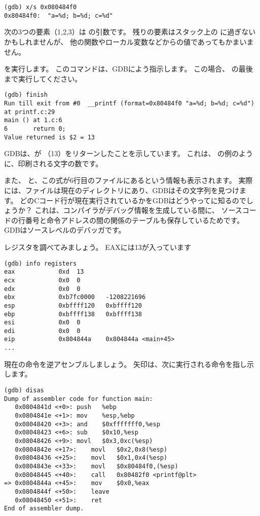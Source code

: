 \begin{lstlisting}
(gdb) x/s 0x080484f0
0x80484f0:	"a=%d; b=%d; c=%d"
\end{lstlisting}

次の3つの要素（1,2,3）は \printf の引数です。
残りの要素はスタック上の に過ぎないかもしれませんが、
他の関数やローカル変数などからの値であってもかまいません。

を実行します。 
このコマンドは、GDBによう指示します。 
この場合、 \printf の最後まで実行してください。

\begin{lstlisting}
(gdb) finish
Run till exit from #0  __printf (format=0x80484f0 "a=%d; b=%d; c=%d") at printf.c:29
main () at 1.c:6
6		return 0;
Value returned is $2 = 13
\end{lstlisting}

\ac{GDB}は、\printf が \EAX （13）をリターンしたことを示しています。 
これは、 \olly の例のように、印刷される文字の数です。

また、 と、この式が6行目のファイルにあるという情報も表示されます。
実際には、ファイルは現在のディレクトリにあり、\ac{GDB}はその文字列を見つけます。 
どのCコード行が現在実行されているかを\ac{GDB}はどうやってに知るのでしょうか？
これは、コンパイラがデバッグ情報を生成している間に、
ソースコードの行番号と命令アドレスの間の関係のテーブルも保存しているためです。 
GDBはソースレベルのデバッガです。

レジスタを調べてみましょう。 
EAXには13が入っています

\begin{lstlisting}
(gdb) info registers
eax            0xd	13
ecx            0x0	0
edx            0x0	0
ebx            0xb7fc0000	-1208221696
esp            0xbffff120	0xbffff120
ebp            0xbffff138	0xbffff138
esi            0x0	0
edi            0x0	0
eip            0x804844a	0x804844a <main+45>
...
\end{lstlisting}

現在の命令を逆アセンブルしましょう。
矢印は、次に実行される命令を指し示します。

\begin{lstlisting}[style=customasmx86]
(gdb) disas
Dump of assembler code for function main:
   0x0804841d <+0>:	push   %ebp
   0x0804841e <+1>:	mov    %esp,%ebp
   0x08048420 <+3>:	and    $0xfffffff0,%esp
   0x08048423 <+6>:	sub    $0x10,%esp
   0x08048426 <+9>:	movl   $0x3,0xc(%esp)
   0x0804842e <+17>:	movl   $0x2,0x8(%esp)
   0x08048436 <+25>:	movl   $0x1,0x4(%esp)
   0x0804843e <+33>:	movl   $0x80484f0,(%esp)
   0x08048445 <+40>:	call   0x80482f0 <printf@plt>
=> 0x0804844a <+45>:	mov    $0x0,%eax
   0x0804844f <+50>:	leave  
   0x08048450 <+51>:	ret    
End of assembler dump.
\end{lstlisting}

